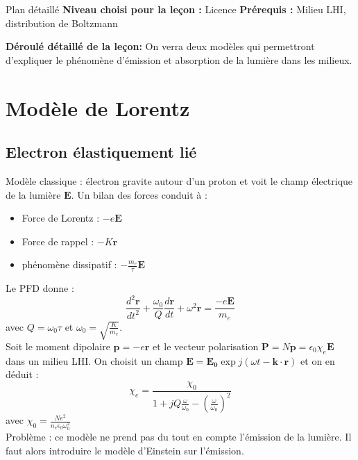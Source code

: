 \begin{reportBlock}{Plan détaillé}
  \textbf{Niveau choisi pour la leçon :} Licence
  \newline
  \textbf{Prérequis : }Milieu LHI, distribution de Boltzmann
  \newline
  
  \textbf{Déroulé détaillé de la leçon: }   \newline
On verra deux modèles qui permettront d'expliquer le phénomène d'émission et absorption de la lumière dans les milieux.
  \section{Modèle de Lorentz}
  
  \subsection{Electron élastiquement lié}
  Modèle classique : électron gravite autour d'un proton et voit le champ électrique de la lumière $\mathbf{E}$. Un bilan des forces conduit à :
  \begin{itemize}
      \item Force de Lorentz : $-e\mathbf{E}$
      \item Force de rappel : $-K\mathbf{r}$
      \item phénomène dissipatif : $-\frac{m_e}{\tau}\mathbf{E}$
  \end{itemize}
Le PFD donne :
\begin{equation}
    \frac{d^2\mathbf{r}}{dt^2} + \frac{\omega_0}{Q}\frac{d\mathbf{r}}{dt} + \omega^2\mathbf{r} = \frac{-e\mathbf{E}}{m_e}
\end{equation}
avec $Q=\omega_0\tau$ et $\omega_0=\sqrt{\frac{K}{m_e}}$.\\

Soit le moment dipolaire $\mathbf{p}=-e\mathbf{r}$ et le vecteur polarisation $\mathbf{P}=N\mathbf{p}=\epsilon_0\chi_e\mathbf{E}$ dans un milieu LHI. On choisit un champ $\mathbf{E}=\mathbf{E_0}\exp{j(\omega t - \mathbf{k}\cdot\mathbf{r})}$ et on en déduit : 
\begin{equation}
    \chi_e = \frac{\chi_0}{1 + jQ\frac{\omega}{\omega_0}-(\frac{\omega}{\omega_0})^2}
\end{equation}
avec $\chi_0=\frac{Ne^2}{n_e\epsilon_0\omega_0^2}$\\

Problème : ce modèle ne prend pas du tout en compte l'émission de la lumière. Il faut alors introduire le modèle d'Einstein sur l'émission.


\end{reportBlock}
